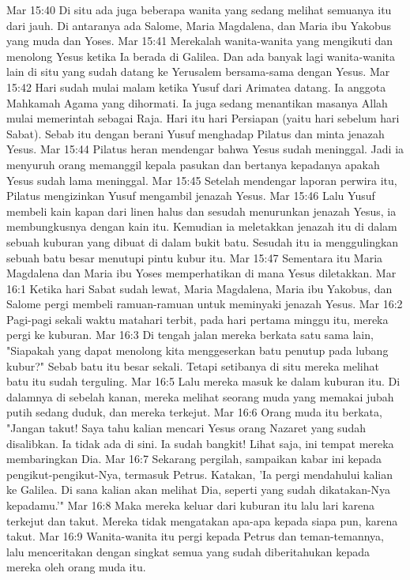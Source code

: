 Mar 15:40  Di situ ada juga beberapa wanita yang sedang melihat semuanya itu dari jauh. Di antaranya ada Salome, Maria Magdalena, dan Maria ibu Yakobus yang muda dan Yoses.
Mar 15:41  Merekalah wanita-wanita yang mengikuti dan menolong Yesus ketika Ia berada di Galilea. Dan ada banyak lagi wanita-wanita lain di situ yang sudah datang ke Yerusalem bersama-sama dengan Yesus.
Mar 15:42  Hari sudah mulai malam ketika Yusuf dari Arimatea datang. Ia anggota Mahkamah Agama yang dihormati. Ia juga sedang menantikan masanya Allah mulai memerintah sebagai Raja. Hari itu hari Persiapan (yaitu hari sebelum hari Sabat). Sebab itu dengan berani Yusuf menghadap Pilatus dan minta jenazah Yesus.
Mar 15:44  Pilatus heran mendengar bahwa Yesus sudah meninggal. Jadi ia menyuruh orang memanggil kepala pasukan dan bertanya kepadanya apakah Yesus sudah lama meninggal.
Mar 15:45  Setelah mendengar laporan perwira itu, Pilatus mengizinkan Yusuf mengambil jenazah Yesus.
Mar 15:46  Lalu Yusuf membeli kain kapan dari linen halus dan sesudah menurunkan jenazah Yesus, ia membungkusnya dengan kain itu. Kemudian ia meletakkan jenazah itu di dalam sebuah kuburan yang dibuat di dalam bukit batu. Sesudah itu ia menggulingkan sebuah batu besar menutupi pintu kubur itu.
Mar 15:47  Sementara itu Maria Magdalena dan Maria ibu Yoses memperhatikan di mana Yesus diletakkan.
Mar 16:1  Ketika hari Sabat sudah lewat, Maria Magdalena, Maria ibu Yakobus, dan Salome pergi membeli ramuan-ramuan untuk meminyaki jenazah Yesus.
Mar 16:2  Pagi-pagi sekali waktu matahari terbit, pada hari pertama minggu itu, mereka pergi ke kuburan.
Mar 16:3  Di tengah jalan mereka berkata satu sama lain, "Siapakah yang dapat menolong kita menggeserkan batu penutup pada lubang kubur?" Sebab batu itu besar sekali. Tetapi setibanya di situ mereka melihat batu itu sudah terguling.
Mar 16:5  Lalu mereka masuk ke dalam kuburan itu. Di dalamnya di sebelah kanan, mereka melihat seorang muda yang memakai jubah putih sedang duduk, dan mereka terkejut.
Mar 16:6  Orang muda itu berkata, "Jangan takut! Saya tahu kalian mencari Yesus orang Nazaret yang sudah disalibkan. Ia tidak ada di sini. Ia sudah bangkit! Lihat saja, ini tempat mereka membaringkan Dia.
Mar 16:7  Sekarang pergilah, sampaikan kabar ini kepada pengikut-pengikut-Nya, termasuk Petrus. Katakan, 'Ia pergi mendahului kalian ke Galilea. Di sana kalian akan melihat Dia, seperti yang sudah dikatakan-Nya kepadamu.'"
Mar 16:8  Maka mereka keluar dari kuburan itu lalu lari karena terkejut dan takut. Mereka tidak mengatakan apa-apa kepada siapa pun, karena takut.
Mar 16:9  Wanita-wanita itu pergi kepada Petrus dan teman-temannya, lalu menceritakan dengan singkat semua yang sudah diberitahukan kepada mereka oleh orang muda itu.
